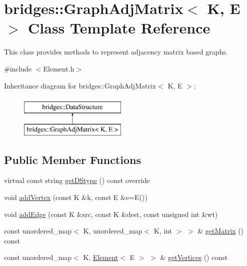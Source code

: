 \hypertarget{classbridges_1_1_graph_adj_matrix}{}\section{bridges\+:\+:Graph\+Adj\+Matrix$<$ K, E $>$ Class Template Reference}
\label{classbridges_1_1_graph_adj_matrix}


This class provides methods to represent adjacency matrix based graphs.  




{\ttfamily \#include $<$Element.\+h$>$}

Inheritance diagram for bridges\+:\+:Graph\+Adj\+Matrix$<$ K, E $>$\+:\begin{figure}[H]
\begin{center}
\leavevmode
\includegraphics[height=2.000000cm]{classbridges_1_1_graph_adj_matrix}
\end{center}
\end{figure}
\subsection*{Public Member Functions}
\begin{DoxyCompactItemize}
\item 
virtual const string \hyperlink{classbridges_1_1_graph_adj_matrix_a05a0140f4e9f1a8cfb87e68960daca7e}{get\+D\+Stype} () const  override
\item 
void \hyperlink{classbridges_1_1_graph_adj_matrix_a7d0c2f70e4030d903b4ecea2ac3b564a}{add\+Vertex} (const K \&k, const E \&e=E())
\item 
void \hyperlink{classbridges_1_1_graph_adj_matrix_a98accd921cace9f9d9cff0925aa1e3b2}{add\+Edge} (const K \&src, const K \&dest, const unsigned int \&wt)
\item 
const unordered\+\_\+map$<$ K, unordered\+\_\+map$<$ K, int $>$ $>$ \& \hyperlink{classbridges_1_1_graph_adj_matrix_a818ecb3143430c3092345c817102a7f3}{get\+Matrix} () const 
\item 
const unordered\+\_\+map$<$ K, \hyperlink{classbridges_1_1_element}{Element}$<$ E $>$ $>$ \& \hyperlink{classbridges_1_1_graph_adj_matrix_a4da8df6629253ffdc16dd95ad6bfe0b4}{get\+Vertices} () const 
\end{DoxyCompactItemize}
